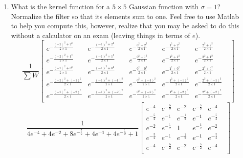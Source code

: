 \documentclass{article}
\begin{document}
\begin{enumerate}
\item What is the kernel function for a $5\times5$ Gaussian function with $\sigma=1$?   Normalize the filter so that its elements sum to one.  Feel free to use Matlab to help you compute this, however, realize that you may be asked to do this without a calculator on an exam (leaving things in terms of $e$).
$$
\frac{1}{\sum{W}}
\begin{bmatrix}
e^{-\frac{(-2)^2+2^2}{2 \times 1}}   &   e^{-\frac{(-1)^2+2^2}{2 \times 1}}   &    e^{-\frac{0^2+2^2}{2 \times 1}}   &     e^{-\frac{1^2+2^2}{2 \times 1}}    &     e^{-\frac{2^2+2^2}{2 \times 1}}    &  \\
e^{-\frac{(-2)^2+1^2}{2 \times 1}}   &   e^{-\frac{(-1)^2+1^2}{2 \times 1}}   &    e^{-\frac{0^2+1^2}{2 \times 1}}   &     e^{-\frac{1^2+1^2}{2 \times 1}}    &     e^{-\frac{2^2+1^2}{2 \times 1}}    &  \\
e^{-\frac{(-2)^2+0^2}{2 \times 1}}   &   e^{-\frac{(-1)^2+0^2}{2 \times 1}}   &    e^{-\frac{0^2+0^2}{2 \times 1}}   &     e^{-\frac{1^2+0^2}{2 \times 1}}    &     e^{-\frac{2^2+0^2}{2 \times 1}}    &  \\
e^{-\frac{(-2)^2+(-1)^2}{2 \times 1}}&   e^{-\frac{(-1)^2+(-1)^2}{2 \times 1}}&    e^{-\frac{0^2+(-1)^2}{2 \times 1}}&     e^{-\frac{1^2+(-1)^2}{2 \times 1}} &     e^{-\frac{2^2+(-1)^2}{2 \times 1}} &  \\
e^{-\frac{(-2)^2+(-2)^2}{2 \times 1}}&   e^{-\frac{(-1)^2+(-2)^2}{2 \times 1}}&    e^{-\frac{0^2+(-2)^2}{2 \times 1}}&     e^{-\frac{1^2+(-2)^2}{2 \times 1}} &     e^{-\frac{2^2+(-2)^2}{2 \times 1}} &  \\


\end{bmatrix}
$$
$$
\frac{1}{4e^{-4} + 4e^{-2} + 8e^{-\frac{5}{2}} + 4e^{-1} + 4e^{-\frac{1}{2}} + 1}
\begin{bmatrix}
e^{-4}          &   e^{-\frac{5}{2}}&   e^{-2}          &   e^{-\frac{5}{2}}&    e^{-4}          &  \\
e^{-\frac{5}{2}}&   e^{-1}          &   e^{-\frac{1}{2}}&   e^{-1}          &    e^{-\frac{5}{2}}&  \\
e^{-2}          &   e^{-\frac{1}{2}}&   1               &   e^{-\frac{1}{2}}&    e^{-2}          &  \\
e^{-\frac{5}{2}}&   e^{-1}          &   e^{-\frac{1}{2}}&   e^{-1}          &    e^{-\frac{5}{2}}&  \\
e^{-4}          &   e^{-\frac{5}{2}}&   e^{-2}          &   e^{-\frac{5}{2}}&    e^{-4}          &  \\
\end{bmatrix}
$$


\end{enumerate}
\end{document}
